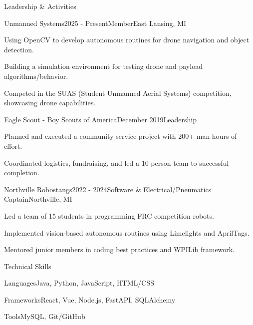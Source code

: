 \documentclass[
	11pt
]{resume}
\begin{document}
	\begin{rSection}{Leadership \& Activities}

		\begin{rSectionEntry}{Unmanned Systems}{2025 - Present}{Member}{East Lansing, MI}
			\item Using OpenCV to develop autonomous routines for drone navigation and object detection.
			\item Building a simulation environment for testing drone and payload algorithms/behavior.
			\item Competed in the SUAS (Student Unmanned Aerial Systems) competition, showcasing drone capabilities.
		\end{rSectionEntry}

		\begin{rSectionEntry}{Eagle Scout - Boy Scouts of America}{December 2019}{Leadership}{}
			\item Planned and executed a community service project with 200+ man-hours of effort.
			\item Coordinated logistics, fundraising, and led a 10-person team to successful completion.
		\end{rSectionEntry}

		\begin{rSectionEntry}{Northville Robostangs}{2022 - 2024}{Software \& Electrical/Pneumatics Captain}{Northville, MI}
			\item Led a team of 15 students in programming FRC competition robots.
			\item Implemented vision-based autonomous routines using Limelights and AprilTags.
			\item Mentored junior members in coding best practices and WPILib framework.
		\end{rSectionEntry}
	\end{rSection}

	\begin{rSection}{Technical Skills}
		\begin{rSet}{Languages}{Java, Python, JavaScript, HTML/CSS}
		\end{rSet}
		\begin{rSet}{Frameworks}{React, Vue, Node.js, FastAPI, SQLAlchemy}
		\end{rSet}
		\begin{rSet}{Tools}{MySQL, Git/GitHub}
		\end{rSet}
	\end{rSection}
\end{document}
